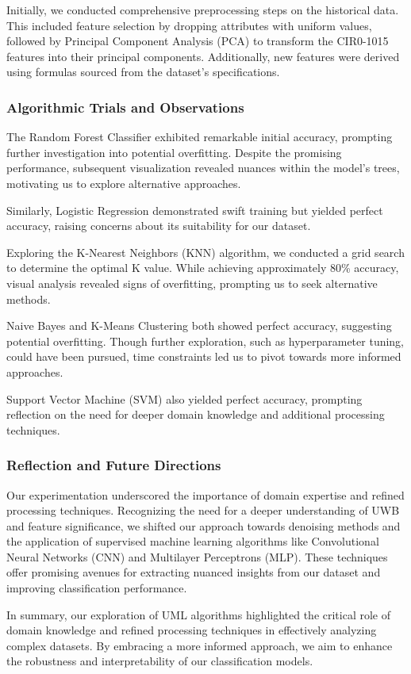 Initially, we conducted comprehensive preprocessing steps on the historical data. This included feature selection by dropping attributes with uniform values, followed by Principal Component Analysis (PCA) to transform the CIR0-1015 features into their principal components. Additionally, new features were derived using formulas sourced from the dataset's specifications.

\subsubsection{Algorithmic Trials and Observations}

The Random Forest Classifier exhibited remarkable initial accuracy, prompting further investigation into potential overfitting. Despite the promising performance, subsequent visualization revealed nuances within the model's trees, motivating us to explore alternative approaches.

Similarly, Logistic Regression demonstrated swift training but yielded perfect accuracy, raising concerns about its suitability for our dataset.

Exploring the K-Nearest Neighbors (KNN) algorithm, we conducted a grid search to determine the optimal K value. While achieving approximately 80\% accuracy, visual analysis revealed signs of overfitting, prompting us to seek alternative methods.

Naive Bayes and K-Means Clustering both showed perfect accuracy, suggesting potential overfitting. Though further exploration, such as hyperparameter tuning, could have been pursued, time constraints led us to pivot towards more informed approaches.

Support Vector Machine (SVM) also yielded perfect accuracy, prompting reflection on the need for deeper domain knowledge and additional processing techniques.

\subsubsection{Reflection and Future Directions}

Our experimentation underscored the importance of domain expertise and refined processing techniques. Recognizing the need for a deeper understanding of UWB and feature significance, we shifted our approach towards denoising methods and the application of supervised machine learning algorithms like Convolutional Neural Networks (CNN) and Multilayer Perceptrons (MLP). These techniques offer promising avenues for extracting nuanced insights from our dataset and improving classification performance.

In summary, our exploration of UML algorithms highlighted the critical role of domain knowledge and refined processing techniques in effectively analyzing complex datasets. By embracing a more informed approach, we aim to enhance the robustness and interpretability of our classification models.
